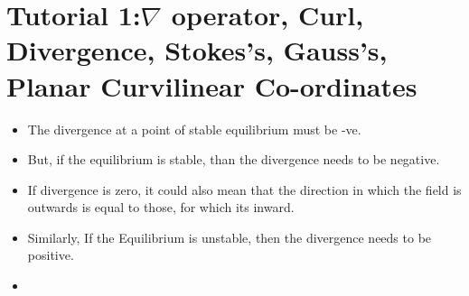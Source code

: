 \documentclass{article}
\begin{document}
\section{Tutorial 1:$\nabla$ operator, Curl, Divergence, Stokes's, Gauss's, Planar Curvilinear Co-ordinates}
\begin{itemize}
  \item The divergence at a point of stable equilibrium must be -ve.
  \item But, if the equilibrium is stable, than the divergence needs to be negative.
  \item If divergence is zero, it could also mean that the direction in which the field is outwards is equal to those, for which its inward.
  \item Similarly, If the Equilibrium is unstable, then the divergence needs to be positive.
  \item
\end{itemize}
\end{document}
